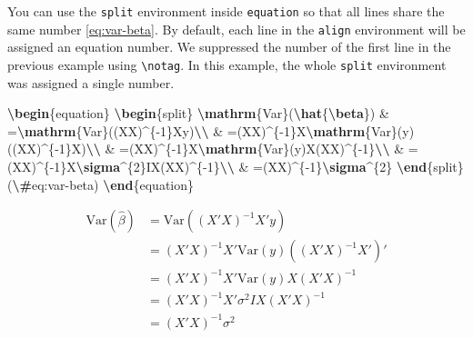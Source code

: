 \documentclass[
  12pt,
]{krantz}
\newenvironment{Shaded}{\begin{snugshade}}{\end{snugshade}}
\newcommand{\ExtensionTok}[1]{#1}
\newcommand{\KeywordTok}[1]{\textcolor[rgb]{0.13,0.29,0.53}{\textbf{#1}}}
\newcommand{\NormalTok}[1]{#1}
\newcommand{\SpecialCharTok}[1]{\textcolor[rgb]{0.81,0.36,0.00}{\textbf{#1}}}
\newcommand{\SpecialStringTok}[1]{\textcolor[rgb]{0.31,0.60,0.02}{#1}}
\theoremstyle{definition}
\theoremstyle{definition}
\theoremstyle{definition}
\theoremstyle{definition}
\theoremstyle{remark}
\begin{document}
You can use the \texttt{split} environment inside \texttt{equation} so that all lines share the same number \eqref{eq:var-beta}. By default, each line in the \texttt{align} environment will be assigned an equation number. We suppressed the number of the first line in the previous example using \texttt{\textbackslash{}notag}. In this example, the whole \texttt{split} environment was assigned a single number.

\begin{Shaded}
\begin{Highlighting}[]
\KeywordTok{\textbackslash{}begin}\NormalTok{\{}\ExtensionTok{equation}\NormalTok{\}}\SpecialStringTok{ }
\KeywordTok{\textbackslash{}begin}\NormalTok{\{}\ExtensionTok{split}\NormalTok{\}}
\SpecialCharTok{\textbackslash{}mathrm}\SpecialStringTok{\{Var\}(}\SpecialCharTok{\textbackslash{}hat}\SpecialStringTok{\{}\SpecialCharTok{\textbackslash{}beta}\SpecialStringTok{\}) \& =}\SpecialCharTok{\textbackslash{}mathrm}\SpecialStringTok{\{Var\}((X\textquotesingle{}X)\^{}\{{-}1\}X\textquotesingle{}y)}\SpecialCharTok{\textbackslash{}\textbackslash{}}
\SpecialStringTok{ \& =(X\textquotesingle{}X)\^{}\{{-}1\}X\textquotesingle{}}\SpecialCharTok{\textbackslash{}mathrm}\SpecialStringTok{\{Var\}(y)((X\textquotesingle{}X)\^{}\{{-}1\}X\textquotesingle{})\textquotesingle{}}\SpecialCharTok{\textbackslash{}\textbackslash{}}
\SpecialStringTok{ \& =(X\textquotesingle{}X)\^{}\{{-}1\}X\textquotesingle{}}\SpecialCharTok{\textbackslash{}mathrm}\SpecialStringTok{\{Var\}(y)X(X\textquotesingle{}X)\^{}\{{-}1\}}\SpecialCharTok{\textbackslash{}\textbackslash{}}
\SpecialStringTok{ \& =(X\textquotesingle{}X)\^{}\{{-}1\}X\textquotesingle{}}\SpecialCharTok{\textbackslash{}sigma}\SpecialStringTok{\^{}\{2\}IX(X\textquotesingle{}X)\^{}\{{-}1\}}\SpecialCharTok{\textbackslash{}\textbackslash{}}
\SpecialStringTok{ \& =(X\textquotesingle{}X)\^{}\{{-}1\}}\SpecialCharTok{\textbackslash{}sigma}\SpecialStringTok{\^{}\{2\}}
\KeywordTok{\textbackslash{}end}\NormalTok{\{}\ExtensionTok{split}\NormalTok{\}}
\SpecialStringTok{(}\SpecialCharTok{\textbackslash{}\#}\SpecialStringTok{eq:var{-}beta)}
\KeywordTok{\textbackslash{}end}\NormalTok{\{}\ExtensionTok{equation}\NormalTok{\} }
\end{Highlighting}
\end{Shaded}

\begin{equation}
\begin{split}
\mathrm{Var}(\hat{\beta}) & =\mathrm{Var}((X'X)^{-1}X'y)\\
 & =(X'X)^{-1}X'\mathrm{Var}(y)((X'X)^{-1}X')'\\
 & =(X'X)^{-1}X'\mathrm{Var}(y)X(X'X)^{-1}\\
 & =(X'X)^{-1}X'\sigma^{2}IX(X'X)^{-1}\\
 & =(X'X)^{-1}\sigma^{2}
\end{split}
\label{eq:var-beta}
\end{equation}
\end{document}
